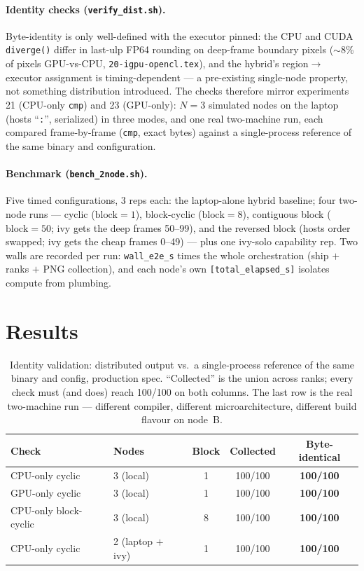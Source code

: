\documentclass[
	english,
	letterpaper, oneside
]{article}
\begin{document}
\paragraph{Identity checks (\texttt{verify\_dist.sh}).} Byte-identity is
only well-defined with the executor pinned: the CPU and CUDA
\texttt{diverge()} differ in last-ulp FP64 rounding on deep-frame boundary
pixels ($\sim$8\% of pixels GPU-vs-CPU, \texttt{20-igpu-opencl.tex}), and
the hybrid's region$\to$executor assignment is timing-dependent --- a
pre-existing single-node property, not something distribution introduced.
The checks therefore mirror experiments 21 (CPU-only \texttt{cmp}) and 23
(GPU-only): $N=3$ simulated nodes on the laptop (hosts ``\texttt{:}'',
serialized) in three modes, and one real two-machine run, each compared
frame-by-frame (\texttt{cmp}, exact bytes) against a single-process
reference of the same binary and configuration.

\paragraph{Benchmark (\texttt{bench\_2node.sh}).} Five timed configurations,
3 reps each: the laptop-alone hybrid baseline; four two-node runs ---
cyclic ($\mathrm{block}=1$), block-cyclic ($\mathrm{block}=8$), contiguous
block ($\mathrm{block}=50$; ivy gets the deep frames 50--99), and the
reversed block (hosts order swapped; ivy gets the cheap frames 0--49) ---
plus one ivy-solo capability rep. Two walls are recorded per run:
\texttt{wall\_e2e\_s} times the whole orchestration (ship $+$ ranks $+$ PNG
collection), and each node's own \texttt{[total\_elapsed\_s]} isolates
compute from plumbing.

\section{Results}
\label{sec:results}

\begin{table}[H]
\centering
\caption{Identity validation: distributed output vs.\ a single-process
reference of the same binary and config, production spec. ``Collected'' is
the union across ranks; every check must (and does) reach 100/100 on both
columns. The last row is the real two-machine run --- different compiler,
different microarchitecture, different build flavour on node~B.\label{tab:identity}}
\begin{tabular}{llccc}
\toprule
Check & Nodes & Block & Collected & Byte-identical \\
\midrule
CPU-only cyclic      & 3 (local)          & 1 & 100/100 & \textbf{100/100} \\
GPU-only cyclic      & 3 (local)          & 1 & 100/100 & \textbf{100/100} \\
CPU-only block-cyclic& 3 (local)          & 8 & 100/100 & \textbf{100/100} \\
CPU-only cyclic      & 2 (laptop $+$ ivy) & 1 & 100/100 & \textbf{100/100} \\
\bottomrule
\end{tabular}
\end{table}
\end{document}
